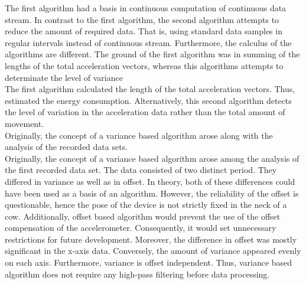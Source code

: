 \documentclass[english,12pt,a4paper,pdftex,elec,utf8]{aaltothesis}
\begin{document}
The first algorithm had a basis in continuous computation of continuous data stream. In contrast to the first algorithm, the second algorithm attempts to reduce the amount of required data. That is, using standard data samples in regular intervals instead of continuous stream. Furthermore, the calculus of the algorithms are different. The ground of the first algorithm was in summing of the lengths of the total acceleration vectors, whereas this algorithms attempts to determinate the level of variance \\


The first algorithm calculated the length of the total acceleration vectors. Thus, estimated the energy consumption. Alternatively, this second algorithm detects the level of variation in the acceleration data rather than the total amount of movement. \\

Originally, the concept of a variance based algorithm arose along with the analysis of the recorded data sets.  \\


Originally, the concept of a variance based algorithm arose among the analysis of the first recorded data set. The data consisted of two distinct period. They differed in variance as well as in offset. In theory, both of these differences could have been used as a basis of an algorithm. However, the reliability of the offset is questionable, hence the pose of the device is not strictly fixed in the neck of a cow. Additionally, offset based algorithm would prevent the use of the offset compensation of the accelerometer. Consequently, it would set unnecessary restrictions for future development. Moreover, the difference in offset was mostly significant in the x-axis data. Conversely, the amount of variance appeared evenly on each axis. Furthermore, variance is offset independent. Thus, variance based algorithm does not require any high-pass filtering before data processing. \\
\end{document}
